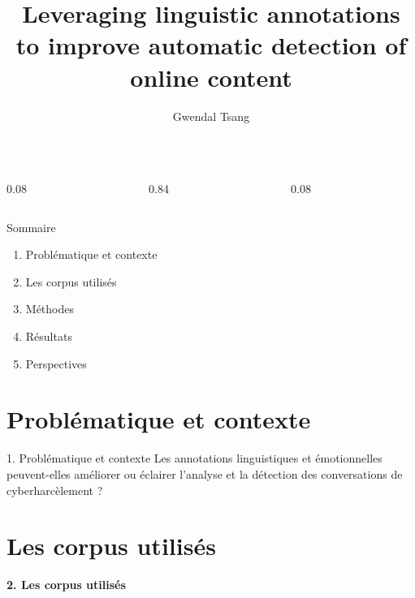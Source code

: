 \documentclass[aspectratio=169,10pt,xcolor=table]{beamer}
\title{Leveraging linguistic annotations to improve automatic detection of online content}
\author{Gwendal Tsang}
\institute{\ Valentina Dragos\\Delphine Battistelli}
\date{}
\begin{document}
\begin{frame}
  \begin{columns}
    \begin{column}{0.08\textwidth}\end{column}
    \begin{column}{0.84\textwidth}
      \titlepage
    \end{column}
    \begin{column}{0.08\textwidth}\end{column}
  \end{columns}
\end{frame}

\begin{frame}{Sommaire}
\large
\begin{center}
  \begin{minipage}{0.42\textwidth}
    \begin{enumerate}
      \item Problématique et contexte
      \item Les corpus utilisés
      \item Méthodes
      \item Résultats
      \item Perspectives
    \end{enumerate}
  \end{minipage}
\end{center}
\end{frame}

\section{Problématique et contexte}

\begin{frame}{1. Problématique et contexte}
\centering
\Large
Les annotations linguistiques et émotionnelles peuvent-elles améliorer ou éclairer l'analyse et la détection des conversations de cyberharcèlement ?
\end{frame}

\section{Les corpus utilisés}

\begin{frame}
  \begin{center}
    {\LARGE\bfseries 2. Les corpus utilisés}\par
  \end{center}
\end{frame}
\end{document}
